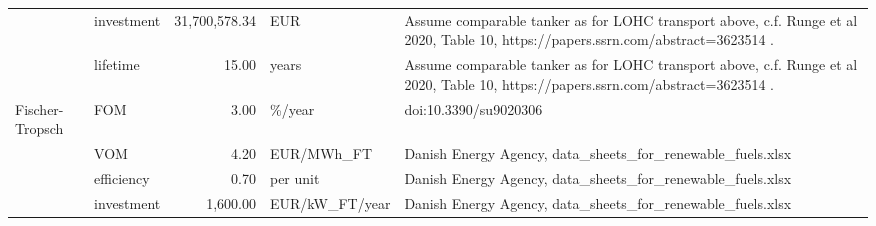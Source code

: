 \begin{longtable}{p{5cm}p{3cm}rp{3cm}p{11cm}}
                      & investment &  31,700,578.34 &                               EUR &                                                                                                                                                                                                    Assume comparable tanker as for LOHC transport above, c.f. Runge et al 2020, Table 10, https://papers.ssrn.com/abstract=3623514 . \\
                      & lifetime &          15.00 &                             years &                                                                                                                                                                                                    Assume comparable tanker as for LOHC transport above, c.f. Runge et al 2020, Table 10, https://papers.ssrn.com/abstract=3623514 . \\
Fischer-Tropsch & FOM &           3.00 &                            \%/year &                                                                                                                                                                                                                                                                                                                doi:10.3390/su9020306 \\
                      & VOM &           4.20 &                        EUR/MWh\_FT &                                                                                                                                                                                                                                                                           Danish Energy Agency, data\_sheets\_for\_renewable\_fuels.xlsx \\
                      & efficiency &           0.70 &                          per unit &                                                                                                                                                                                                                                                                           Danish Energy Agency, data\_sheets\_for\_renewable\_fuels.xlsx \\
                      & investment &       1,600.00 &                    EUR/kW\_FT/year &                                                                                                                                                                                                                                                                           Danish Energy Agency, data\_sheets\_for\_renewable\_fuels.xlsx \\

\end{longtable}

